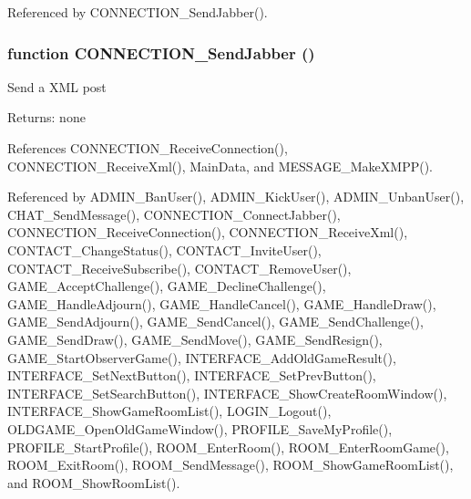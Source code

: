 Referenced by CONNECTION\_\-SendJabber().
\subsubsection{\setlength{\rightskip}{0pt plus 5cm}function CONNECTION\_\-SendJabber ()}\label{connection_8js_c49f7b7225ba663c90a59f9c2b7bff18}


Send a XML post

\begin{Desc}
\item[Returns:]none \end{Desc}


References CONNECTION\_\-ReceiveConnection(), CONNECTION\_\-ReceiveXml(), MainData, and MESSAGE\_\-MakeXMPP().

Referenced by ADMIN\_\-BanUser(), ADMIN\_\-KickUser(), ADMIN\_\-UnbanUser(), CHAT\_\-SendMessage(), CONNECTION\_\-ConnectJabber(), CONNECTION\_\-ReceiveConnection(), CONNECTION\_\-ReceiveXml(), CONTACT\_\-ChangeStatus(), CONTACT\_\-InviteUser(), CONTACT\_\-ReceiveSubscribe(), CONTACT\_\-RemoveUser(), GAME\_\-AcceptChallenge(), GAME\_\-DeclineChallenge(), GAME\_\-HandleAdjourn(), GAME\_\-HandleCancel(), GAME\_\-HandleDraw(), GAME\_\-SendAdjourn(), GAME\_\-SendCancel(), GAME\_\-SendChallenge(), GAME\_\-SendDraw(), GAME\_\-SendMove(), GAME\_\-SendResign(), GAME\_\-StartObserverGame(), INTERFACE\_\-AddOldGameResult(), INTERFACE\_\-SetNextButton(), INTERFACE\_\-SetPrevButton(), INTERFACE\_\-SetSearchButton(), INTERFACE\_\-ShowCreateRoomWindow(), INTERFACE\_\-ShowGameRoomList(), LOGIN\_\-Logout(), OLDGAME\_\-OpenOldGameWindow(), PROFILE\_\-SaveMyProfile(), PROFILE\_\-StartProfile(), ROOM\_\-EnterRoom(), ROOM\_\-EnterRoomGame(), ROOM\_\-ExitRoom(), ROOM\_\-SendMessage(), ROOM\_\-ShowGameRoomList(), and ROOM\_\-ShowRoomList().